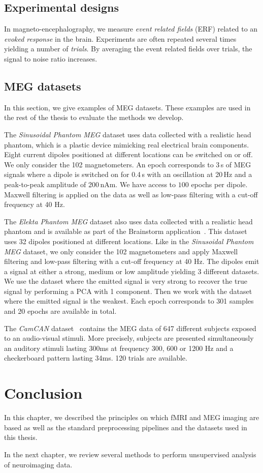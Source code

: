 \subsection{Experimental designs}
In magneto-encephalography, we measure \emph{event related fields} (ERF) related to an
\emph{evoked response} in the brain.
Experiments are often repeated several times yielding a number of \emph{trials}.
By averaging the event related fields over trials, the signal to noise ratio increases.

\subsection{MEG datasets}
\label{sec:meg:datasets}
In this section, we give examples of MEG datasets. These examples are used in
the rest of the thesis to evaluate the methods we develop.

The \emph{Sinusoidal Phantom MEG} dataset uses data collected with a realistic head phantom, which is a plastic device mimicking real electrical brain components.
% 
Eight current dipoles positioned at different locations can be switched on or off.
% 
We only consider the 102 magnetometers.
% 
An epoch corresponds to 3\,s of MEG signals where a dipole is switched on for 0.4\,s with an oscillation at 20\,Hz and a peak-to-peak amplitude of 200\,nAm.
% 
We have access to $100$ epochs per dipole.
%
Maxwell filtering is applied on the data as well as low-pass filtering with a cut-off
frequency at 40 Hz.

The \emph{Elekta Phantom MEG} dataset also uses data collected with a realistic
head phantom and is available as part of the Brainstorm
application~\cite{tadel2011brainstorm}.
This dataset uses 32 dipoles positioned at different locations. Like in the
\emph{Sinusoidal Phantom MEG} dataset, we only
consider the 102 magnetometers and apply Maxwell filtering and low-pass filtering
with a cut-off frequency at 40 Hz. The dipoles emit a signal at either a strong, medium or low
amplitude yielding 3 different datasets.
We use the dataset where the emitted signal is very strong to recover the true signal
by performing a PCA with 1 component.
Then we work with the dataset where the emitted signal is the weakest.
Each epoch corresponds to 301 samples and 20 epochs are available in total.

The \emph{CamCAN} dataset~\cite{shafto2014cambridge}
contains the MEG data of 647 different
subjects exposed to an audio-visual stimuli. More precisely, subjects are presented simultaneously an
auditory stimuli lasting 300ms at frequency 300, 600 or 1200 Hz  and a
checkerboard pattern lasting 34ms. 120 trials are available.

\section{Conclusion}
In this chapter, we described the principles on which fMRI and MEG imaging
are based as well as the standard preprocessing pipelines and the datasets used
in this thesis.

In the next chapter, we review several methods to perform unsupervised analysis
of neuroimaging data.

